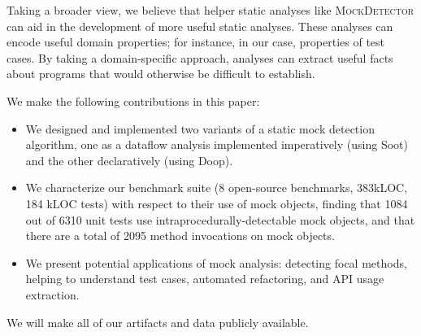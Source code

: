 Taking a broader view, we believe that helper static analyses like \textsc{MockDetector} 
can aid
in the development of more useful static analyses. These analyses can
encode useful domain properties; for instance, in our case, properties
of test cases. By taking a domain-specific approach, analyses can extract
useful facts about programs that would otherwise be difficult to establish.

We make the following contributions in this paper:
\begin{itemize}
\item We designed and implemented two variants of a static mock detection algorithm, one as a dataflow analysis implemented imperatively (using Soot) and the other declaratively (using Doop).
\item We characterize our benchmark suite (8 open-source benchmarks, 383kLOC, 184 kLOC tests) with respect to their use of mock objects, finding that 1084 out of 6310 unit tests use intraprocedurally-detectable mock objects, and that there are a total of 2095 method invocations on mock objects. %
\item We present potential applications of mock analysis: detecting focal methods, helping to understand test cases, automated refactoring, and API usage extraction.
\end{itemize}

We will make all of our artifacts and data publicly available.

